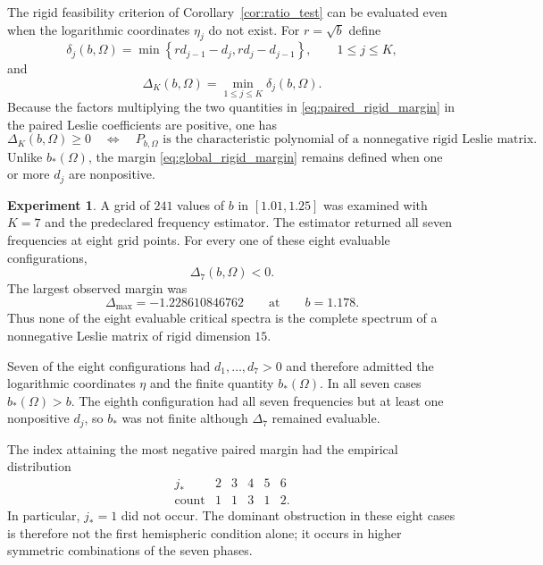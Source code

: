 \documentclass[11pt]{amsart}
\numberwithin{equation}{section}
\theoremstyle{plain}
\theoremstyle{definition}
\newtheorem{experiment}[theorem]{Experiment}
\theoremstyle{remark}
\begin{document}
The rigid feasibility criterion of Corollary~\ref{cor:ratio_test} can be evaluated even when the logarithmic coordinates $\eta_j$ do not exist.  For $r=\sqrt b$ define
\begin{equation}
\delta_j(b,\Omega)
=
\min\left\{
 r d_{j-1}-d_j,
 r d_j-d_{j-1}
\right\},
\qquad 1\leq j\leq K,
\label{eq:paired_rigid_margin}
\end{equation}
and
\begin{equation}
\Delta_K(b,\Omega)
=
\min_{1\leq j\leq K}\delta_j(b,\Omega).
\label{eq:global_rigid_margin}
\end{equation}
Because the factors multiplying the two quantities in \eqref{eq:paired_rigid_margin} in the paired Leslie coefficients are positive, one has
\begin{equation}
\Delta_K(b,\Omega)\geq0
\quad\Longleftrightarrow\quad
P_{b,\Omega}
\text{ is the characteristic polynomial of a nonnegative rigid Leslie matrix}.
\label{eq:delta_exact_feasibility}
\end{equation}
Unlike $b_*(\Omega)$, the margin \eqref{eq:global_rigid_margin} remains defined when one or more $d_j$ are nonpositive.

\begin{experiment}
\label{exp:K7_rigid_obstruction}
A grid of $241$ values of $b$ in $[1.01,1.25]$ was examined with $K=7$ and the predeclared frequency estimator.  The estimator returned all seven frequencies at eight grid points.  For every one of these eight evaluable configurations,
\begin{equation}
\Delta_7(b,\Omega)<0.
\label{eq:K7_all_negative}
\end{equation}
The largest observed margin was
\begin{equation}
\boxed{
\Delta_{\max}=-1.228610846762
}
\qquad\text{at}\qquad
\boxed{b=1.178}.
\label{eq:K7_delta_max}
\end{equation}
Thus none of the eight evaluable critical spectra is the complete spectrum of a nonnegative Leslie matrix of rigid dimension $15$.

Seven of the eight configurations had $d_1,\ldots,d_7>0$ and therefore admitted the logarithmic coordinates $\eta$ and the finite quantity $b_*(\Omega)$.  In all seven cases $b_*(\Omega)>b$.  The eighth configuration had all seven frequencies but at least one nonpositive $d_j$, so $b_*$ was not finite although $\Delta_7$ remained evaluable.

The index attaining the most negative paired margin had the empirical distribution
\begin{equation}
\begin{array}{c|ccccc}
 j_* & 2&3&4&5&6\\
\hline
\text{count} &1&1&3&1&2.
\end{array}
\label{eq:K7_obstruction_index_counts}
\end{equation}
In particular, $j_*=1$ did not occur.  The dominant obstruction in these eight cases is therefore not the first hemispheric condition alone; it occurs in higher symmetric combinations of the seven phases.
\end{experiment}
\end{document}

